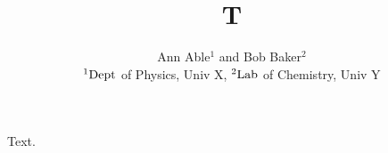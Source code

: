 \documentclass{article}
\begin{document}
\title{T}
\author{Ann Able$^{1}$ and Bob Baker$^{2}$\\ ${\rm ^1Dept}$ of Physics, Univ X, ${\rm ^2Lab}$ of Chemistry, Univ Y}
\maketitle
Text.
\end{document}
